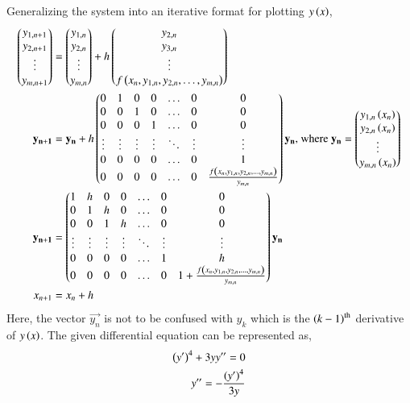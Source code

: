 \documentclass[journal]{IEEEtran}
\begin{document}
Generalizing the system into an iterative format for plotting $y\left(x\right)$,
\begin{align}
    \begin{pmatrix}y_{1, n + 1}\\y_{2, n + 1}\\\vdots\\y_{m, n + 1}\end{pmatrix} &= \begin{pmatrix}y_{1, n}\\y_{2, n}\\\vdots\\y_{m, n}\end{pmatrix} + h\begin{pmatrix}y_{2, n}\\y_{3, n}\\\vdots\\f\left(x_n, y_{1, n}, y_{2, n}, \dots, y_{m, n}\right)\end{pmatrix}\\
    \mathbf{y_{n + 1}} &= \mathbf{y_{n}} + h\begin{pmatrix}0 & 1 & 0 & 0 & \dots & 0 & 0\\ 0 & 0 & 1 & 0 & \dots & 0 & 0\\0 & 0 & 0 & 1 & \dots & 0 & 0\\\vdots & \vdots & \vdots & \vdots & \ddots & \vdots & \vdots\\ 0 & 0 & 0 & 0 & \dots & 0 & 1\\0 & 0 & 0 & 0 & \dots & 0 & \frac{f\left(x_n, y_{1, n}, y_{2, n}, \dots, y_{m, n}\right)}{y_{m, n}}\end{pmatrix}\mathbf{y_n} \text{, where } \mathbf{y_n} = \begin{pmatrix}y_{1, n}\left(x_n\right)\\y_{2, n}\left(x_n\right)\\\vdots\\y_{m, n}\left(x_n\right)\end{pmatrix}\\
    \mathbf{y_{n + 1}} &= \begin{pmatrix}1 & h & 0 & 0 & \dots & 0 & 0\\ 0 & 1 & h & 0 & \dots & 0 & 0\\0 & 0 & 1 & h & \dots & 0 & 0\\\vdots & \vdots & \vdots & \vdots& \ddots & \vdots & \vdots\\ 0 & 0 & 0 & 0 & \dots & 1 & h\\0 & 0 & 0 & 0 & \dots & 0 & 1+\frac{f\left(x_n, y_{1, n}, y_{2, n}, \dots, y_{m, n}\right)}{y_{m, n}}\end{pmatrix}\mathbf{y_n}\\
    x_{n + 1} &= x_{n} + h
\end{align}
Here, the vector $\vec{y_n}$ is not to be confused with $y_k$ which is the $\left(k - 1\right)^{\text{th}}$ derivative of $y\left(x\right)$.
\newline
The given differential equation can be represented as,
\begin{align}
    \left(y^{\prime}\right)^4 + 3yy^{\prime\prime} = 0\\
    y^{\prime\prime} = -\frac{\left(y^{\prime}\right)^4}{3y}
\end{align}
\end{document}
